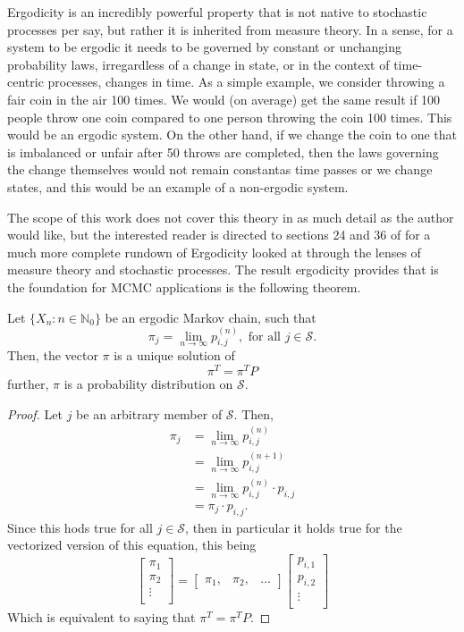 Ergodicity is an incredibly powerful property that is not native to stochastic processes per say, but rather it is inherited from measure theory. In a sense, for a system to be ergodic it needs to be governed by constant or unchanging probability laws, irregardless of a change in state, or in the context of time-centric processes, changes in time. As a simple example, we consider throwing a fair coin in the air 100 times. We would (on average) get the same result if 100 people throw one coin compared to one person throwing the coin 100 times. This would be an ergodic system. On the other hand, if we change the coin to one that is imbalanced or unfair after 50 throws are completed, then the laws governing the change themselves would not remain constantas time passes or we change states, and this would be an example of a non-ergodic system. 

The scope of this work does not cover this theory in as much detail as the author would like, but the interested reader is directed to sections 24 and 36 of \cite{billingsley2012probability} for a much more complete rundown of Ergodicity looked at through the lenses of measure theory and stochastic processes. The result ergodicity provides that is the foundation for MCMC applications is the following theorem. 

\begin{theorem}
	Let $\{ X_n: n \in \mathbb{N}_0\}$ be an ergodic Markov chain, such that 
	\[ \pi_j = \lim_{n \rightarrow \infty} p_{i,j}^{(n)}, \text{ for all } j \in \mathcal{S}. \]
	Then, the vector $\pi$ is a unique solution of 
	\[ \pi^T = \pi^T P \]
	further, $\pi$ is a probability distribution on $\mathcal{S}$. 
\end{theorem}

\begin{proof}
	Let $j$ be an arbitrary member of $\mathcal{S}$. Then, 
	\begin{align*}
		\pi_j &= \lim_{n \rightarrow \infty} p_{i,j}^{(n)} \\
		&= \lim_{n \rightarrow \infty} p_{i,j}^{(n+1)} \\
		&= \lim_{n \rightarrow \infty} p_{i,j}^{(n)} \cdot p_{i,j} \\
		&= \pi_j \cdot p_{i,j}.
	\end{align*}
	Since this hods true for all $j \in \mathcal{S}$, then in particular it holds true for the vectorized version of this equation, this being 
	\[ \begin{bmatrix}
		\pi_1 \\
		\pi_2 \\
		\vdots \\
	\end{bmatrix} = 
	\begin{bmatrix}
		\pi_1, &
		\pi_2, &
		\ldots 
	\end{bmatrix} 
	\begin{bmatrix}
		p_{i,1} \\
		p_{i,2} \\
		\vdots \\
	\end{bmatrix} \]
Which is equivalent to saying that $\pi^T = \pi^T P$.
\end{proof}

